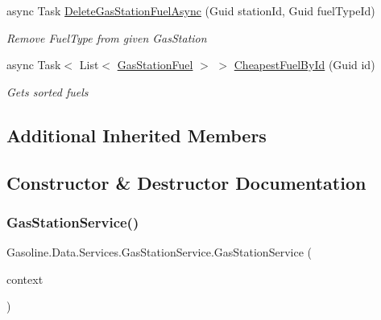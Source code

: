 \begin{DoxyCompactItemize}
async Task \mbox{\hyperlink{class_gasoline_1_1_data_1_1_services_1_1_gas_station_service_aced2362a8a06e2052178b96980c25b67}{Delete\+Gas\+Station\+Fuel\+Async}} (Guid station\+Id, Guid fuel\+Type\+Id)
\begin{DoxyCompactList}\small\item\em Remove Fuel\+Type from given Gas\+Station \end{DoxyCompactList}\item 
async Task$<$ List$<$ \mbox{\hyperlink{class_gasoline_1_1_data_1_1_models_1_1_gas_station_fuel}{Gas\+Station\+Fuel}} $>$ $>$ \mbox{\hyperlink{class_gasoline_1_1_data_1_1_services_1_1_gas_station_service_a5f5ecf08135560403c4f08126ff8138a}{Cheapest\+Fuel\+By\+Id}} (Guid id)
\begin{DoxyCompactList}\small\item\em Gets sorted fuels \end{DoxyCompactList}\end{DoxyCompactItemize}
\subsection*{Additional Inherited Members}


\subsection{Constructor \& Destructor Documentation}
\mbox{\label{class_gasoline_1_1_data_1_1_services_1_1_gas_station_service_a11c6e9e391f1673e3d6f65b2ae9b7fe2}} 
\subsubsection{\texorpdfstring{GasStationService()}{GasStationService()}}
{\footnotesize\ttfamily Gasoline.\+Data.\+Services.\+Gas\+Station\+Service.\+Gas\+Station\+Service (\begin{DoxyParamCaption}\item[{\mbox{\hyperlink{class_gasoline_1_1_data_1_1_e_f_1_1_gasoline_context}{Gasoline\+Context}}}]{context }\end{DoxyParamCaption})}



